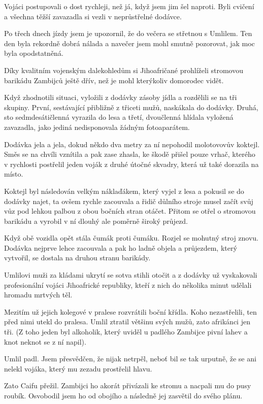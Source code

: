 Vojáci postupovali o dost rychleji, než já, když jsem jim šel naproti. Byli cvičení a všechna těžší zavazadla si vezli v neprůstřelné dodávce.

Po třech dnech jízdy jsem je upozornil, že do večera se střetnou s Umlilem. Ten den byla rekordně dobrá nálada a navečer jsem mohl smutně pozorovat, jak moc byla opodstatněná.
	
Díky kvalitním vojenským dalekohledům si Jihoafričané prohlíželi stromovou barikádu Zambijců ještě dřív, než je mohl kterýkoliv domorodec vidět.

Když zhodnotili situaci, vyložili z dodávky zásoby jídla a rozdělili se na tři skupiny. První, sestávající přibližně z třiceti mužů, naskákala do dodávky. Druhá, sto sedmdesátičlenná vyrazila do lesa a třetí, dvoučlenná hlídala vyložená zavazadla, jako jediná nedisponovala žádným fotoaparátem.

Dodávka jela a jela, dokud někdo dva metry za ní nepohodil molotovovův koktejl.  Směs se na chvíli vznítila a pak zase zhasla, ke škodě přišel pouze vrhač, kterého v rychlosti postřelil jeden voják z druhé útočné skvadry, která už také dorazila na místo.

Koktejl byl následován velkým náklaďákem, který vyjel z lesa a pokusil se do dodávky najet, ta ovšem rychle zacouvala a řidič důlního stroje musel začít svůj vůz pod lehkou palbou z obou bočních stran otáčet. Přitom se otřel o stromovou barikádu a vyrobil v ní dlouhý ale poměrně široký průjezd.

Když obě vozidla opět stála čumák proti čumáku. Rozjel se mohutný stroj znovu. Dodávka nejprve lehce zacouvala a pak ho ladně objela a průjezdem, který vytvořil, se dostala na druhou stranu barikády.   

Umlilovi muži za kládami ukrytí se sotva stihli otočit a z dodávky už vyskakovali profesionální vojáci Jihoafrické republiky, kteří z nich do několika minut udělali hromadu mrtvých těl.

Mezitím už jejich kolegové v pralese rozvrátili boční křídla. Koho nezastřelili, ten před nimi utekl do pralesa. Umlil ztratil většinu svých mužů, zato afrikánci jen tři. (Z toho jeden byl alkoholik, který uviděl u padlého Zambijce pivní lahev a knot neknot se z ní napil).

Umlil padl. Jsem přesvědčen, že nijak netrpěl, neboť bil se tak urputně, že se ani nelekl vojáka, který mu zezadu prostřelil hlavu.

Zato Caifu přežil. Zambijci ho akorát přivázali ke stromu a nacpali mu do pusy roubík.  Osvobodil jsem ho od obojího a následně jej zasvětil do svého plánu.


